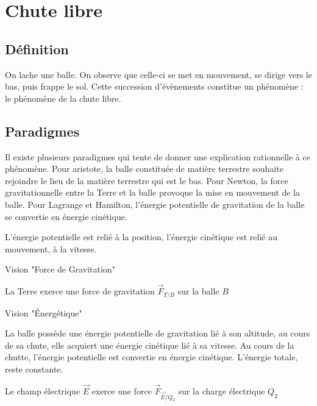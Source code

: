 
\section{Chute libre}
%
\subsection{Définition}

On lache une balle. On observe que celle-ci se met en mouvement, se dirige vers le bas, puis frappe le sol. Cette succession d'évènements constitue un phénomène : le phénomène de la chute libre.
\begin{center}

\end{center}

\subsection{Paradigmes}

Il existe plusieurs paradigmes qui tente de donner une explication rationnelle à ce phénomène. Pour aristote, la balle constituée de matière terrestre souhaite rejoindre le lieu de la matière terrestre qui est le bas. Pour Newton, la force gravitationnelle entre la Terre et la balle provoque la mise en mouvement de la balle. Pour Lagrange et Hamilton, l'énergie potentielle de gravitation de la balle se convertie en énergie cinétique. 


L'énergie potentielle est relié à la position, l'énergie cinétique est relié au mouvement, à la vitesse.

\begin{center}
Vision "Force de Gravitation"
\end{center}
La Terre exerce une force de gravitation $\overrightarrow{F}_{T/B}$ sur la balle $B$

\begin{center}
Vision "Énergétique"
\end{center}
La balle possède une énergie potentielle de gravitation lié à son altitude, au cours de sa chute, elle acquiert une énergie cinétique lié à sa vitesse. Au cours de la chutte, l'énergie potentielle est convertie en énergie cinétique. L'énergie totale, reste constante.

Le champ électrique $\overrightarrow{E}$ exerce une force $\overrightarrow{F}_{\overrightarrow{E}/Q_2}$ sur la charge électrique $Q_2$



